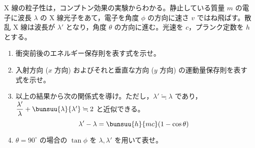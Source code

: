\item
    \begin{mawarikomi}{150pt}{
        
    }
    X 線の粒子性は，コンプトン効果の実験からわかる。静止している質量 $m$ の電子に波長 $\lambda$ の X 線光子をあて，電子を角度 $\phi$ の方向に速さ $v$ ではね飛ばす。散乱 X 線は波長が $\lambda'$ となり，角度 $\theta$ の方向に進む。光速を $c$，プランク定数を $h$ とする。
    \begin{enumerate}
        \item 衝突前後のエネルギー保存則を表す式を示せ。
        \item 入射方向 ($x$ 方向) およびそれと垂直な方向 ($y$ 方向) の運動量保存則を表す式を示せ。
        \item 以上の結果から次の関係式を導け。ただし，$\lambda' \fallingdotseq \lambda$ であり，$\dfrac{\lambda'}{\lambda} + \bunsuu{\lambda}{\lambda'} \fallingdotseq 2$ と近似できる。
$$
\lambda' - \lambda = \bunsuu{h}{mc}(1 - \cos\theta)
$$

        \item $\theta = 90^\circ$ の場合の $\tan\phi$ を $\lambda, \lambda'$ を用いて表せ。
    \end{enumerate}
\end{mawarikomi}
